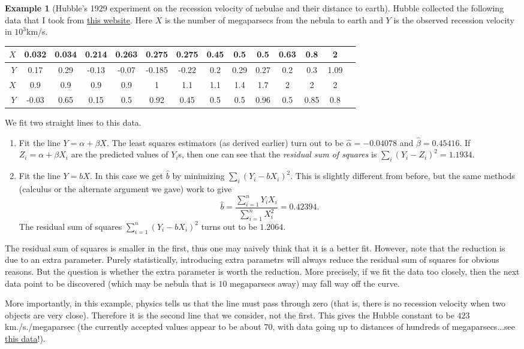 \documentclass[preprint,  11pt]{amsart}
\theoremstyle{plain} %
\theoremstyle{definition} %
\newtheorem{example}[theorem]{Example}
\begin{document}
\begin{example} [Hubble's 1929 experiment on the recession velocity of nebulae and their distance to earth] Hubble collected the following data that I took from \href{http://lib.stat.cmu.edu/DASL/Datafiles/Hubble.html}{this website}. Here $X$ is the number of megaparsecs from the nebula to earth and $Y$ is the observed recession velocity in $10^{3}$km/s.
\begin{center}
\begin{tabular}{||r|c|c|c|c|c|c|c|c|c|c|c|c|c||}
\hline
$X$  & 0.032 & 0.034 & 0.214 & 0.263 & 0.275 & 0.275 & 0.45 & 0.5 & 0.5 & 0.63 & 0.8 &  2 \\
\hline
$Y$  & 0.17 & 0.29 & -0.13 & -0.07 & -0.185 & -0.22 & 0.2 & 0.29 & 0.27 & 0.2 & 0.3 & 1.09\\
\hline
\hline
$X$ & 0.9 & 0.9 & 0.9 & 0.9 & 1 & 1.1 & 1.1 & 1.4 & 1.7 & 2 & 2 & 2 \\
\hline
$Y$ & -0.03 & 0.65 & 0.15 & 0.5 & 0.92 & 0.45 & 0.5 & 0.5 & 0.96 & 0.5 & 0.85 & 0.8   \\
\hline
\hline
\end{tabular}
\end{center}
We fit two straight lines to this data.
\begin{enumerate}\setlength\itemsep{6pt}
\item Fit the line $Y=\alpha+\beta X$. The least squares estimators (as derived earlier) turn out to be $\hat{\alpha}=-0.04078$ and $\hat{\beta}=0.45416$.  If $Z_{i}=\alpha+\beta X_{i}$ are the predicted values of $Y_{i}$s, then one can see that the {\em residual sum of squares} is $\sum_{i}(Y_{i}-Z_{i})^{2}=1.1934$.
\item Fit the line $Y=bX$. In this case we get $\hat{b}$ by minimizing $\sum_{i}(Y_{i}-bX_{i})^{2}$. This is slightly different from before, but the same methods (calculus or the alternate argument we gave) work to give 
$$
\hat{b}=\frac{\sum_{i=1}^{n}Y_{i}X_{i}}{\sum_{i=1}^{n}X_{i}^{2}}= 0.42394.
$$
The residual sum of squares $\sum_{i=1}^{n}(Y_{i}-bX_{i})^{2}$ turns out to be $1.2064$.
\end{enumerate}
The residual sum of squares is smaller in the first, thus one may naively think that it is a better fit. However, note that the reduction is due to an extra parameter. Purely statistically, introducing extra parametrs will always reduce the residual sum of squares for obvious reasons. But the question is whether the extra parameter is worth the reduction. More precisely, if we fit the data too closely, then the next data point to be discovered (which may be nebula that is $10$ megaparsecs away)  may fall way off the curve.

More importantly, in this example, physics tells us  that the line must pass through zero (that is, there is no recession velocity when two objects are very close). Therefore it is the second line that we consider, not the first. This gives the Hubble constant to be $423$ km./s./megaparsec (the currently accepted values appear to be about $70$, with data going up to distances of hundreds of megaparsecs...see  \href{https://www.cfa.harvard.edu/~dfabricant/huchra/hubble.plot.dat}{this data}!).
\end{example}
\end{document}
